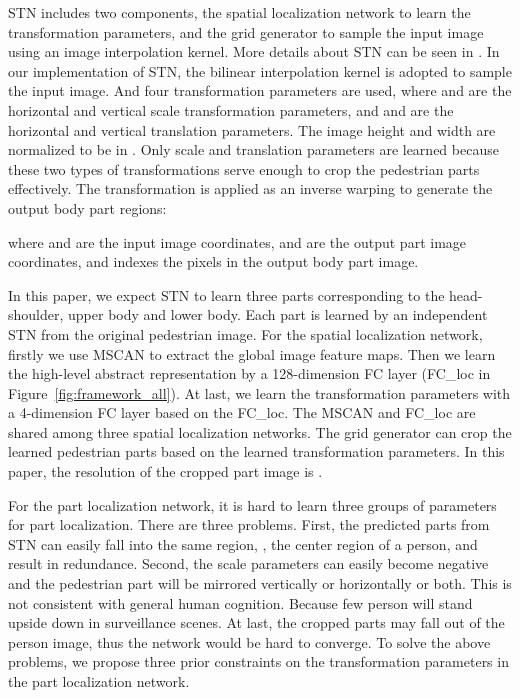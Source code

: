 \documentclass[10pt,twocolumn,letterpaper]{article}
\begin{document}
STN includes two components, the spatial localization network to learn the transformation parameters,
and the grid generator to sample the input image using an image interpolation kernel. More details about STN can be seen in \cite{JaderbergNIPS15spatial}.
In our implementation of STN, the bilinear interpolation kernel is adopted to sample the input image.
And four transformation parameters  are used, where  and  are the horizontal and vertical scale transformation parameters,
and  and  are the horizontal and vertical translation parameters.
The image height and width are normalized to be in .
Only scale and translation parameters are learned because these two types of transformations serve enough to crop the pedestrian parts effectively.
The transformation is applied as an inverse warping to generate the output body part regions:
\vspace{-0.2em}


where  and  are the input image coordinates,  and  are the output part image coordinates, and  indexes the pixels in the output body part image.

In this paper, we expect STN to learn three parts corresponding to the head-shoulder, upper body and lower body.
Each part is learned by an independent STN from the original pedestrian image.
For the spatial localization network, firstly we use MSCAN to extract the global image feature maps.
Then we learn the high-level abstract representation by a 128-dimension FC layer (FC\_{loc} in Figure~\ref{fig:framework_all}).
At last, we learn the transformation parameters  with a 4-dimension FC layer based on the FC\_loc.
The MSCAN and FC\_{loc} are shared among three spatial localization networks.
The grid generator can crop the learned pedestrian parts based on the learned transformation parameters.
In this paper, the resolution of the cropped part image is .

For the part localization network, it is hard to learn three groups of parameters for part localization.
There are three problems.
First, the predicted parts from STN can easily fall into the same region, \eg, the center region of a person,
and result in redundance.
Second, the scale parameters can easily become negative and the pedestrian part will be mirrored vertically or horizontally or both.
This is not consistent with general human cognition.
Because few person will stand upside down in surveillance scenes.
At last, the cropped parts may fall out of the person image, thus the network would be hard to converge.
To solve the above problems, we propose three prior constraints on the transformation parameters in the part localization network.
\end{document}
